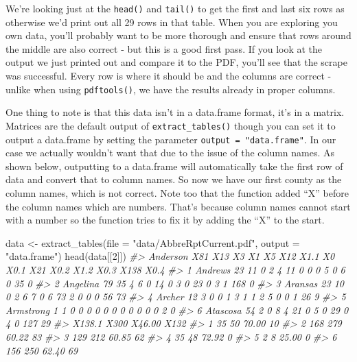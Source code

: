 \documentclass[
]{krantz}
\makeatletter
\newenvironment{Shaded}{\begin{snugshade}}{\end{snugshade}}
\newcommand{\AttributeTok}[1]{\textcolor[rgb]{0.61,0.61,0.61}{#1}}
\newcommand{\CommentTok}[1]{\textcolor[rgb]{0.37,0.37,0.37}{\textit{#1}}}
\newcommand{\DecValTok}[1]{\textcolor[rgb]{0.06,0.06,0.06}{#1}}
\newcommand{\FunctionTok}[1]{\textcolor[rgb]{0,0,0}{#1}}
\newcommand{\NormalTok}[1]{#1}
\newcommand{\OtherTok}[1]{\textcolor[rgb]{0.37,0.37,0.37}{#1}}
\newcommand{\StringTok}[1]{\textcolor[rgb]{0.5,0.5,0.5}{#1}}
\newenvironment{kframe}{%
\medskip{}
\setlength{\fboxsep}{.8em}
 \def\at@end@of@kframe{}%
 \ifinner\ifhmode%
  \def\at@end@of@kframe{\end{minipage}}%
  \begin{minipage}{\columnwidth}%
 \fi\fi%
 \def\FrameCommand##1{\hskip\@totalleftmargin \hskip-\fboxsep
 \colorbox{shadecolor}{##1}\hskip-\fboxsep
     \hskip-\linewidth \hskip-\@totalleftmargin \hskip\columnwidth}%
 \MakeFramed {\advance\hsize-\width
   \@totalleftmargin\z@ \linewidth\hsize
   \@setminipage}}%
 {\par\unskip\endMakeFramed%
 \at@end@of@kframe}
\renewenvironment{Shaded}{\begin{kframe}}{\end{kframe}}
\makeatother
\begin{document}
We're looking just at the \texttt{head()} and \texttt{tail()} to get the first and last six rows as otherwise we'd print out all 29 rows in that table. When you are exploring you own data, you'll probably want to be more thorough and ensure that rows around the middle are also correct - but this is a good first pass. If you look at the output we just printed out and compare it to the PDF, you'll see that the scrape was successful. Every row is where it should be and the columns are correct - unlike when using \texttt{pdftools()}, we have the results already in proper columns.

One thing to note is that this data isn't in a data.frame format, it's in a matrix. Matrices are the default output of \texttt{extract\_tables()} though you can set it to output a data.frame by setting the parameter \texttt{output\ =\ "data.frame"}. In our case we actually wouldn't want that due to the issue of the column names. As shown below, outputting to a data.frame will automatically take the first row of data and convert that to column names. So now we have our first county as the column names, which is not correct. Note too that the function added ``X'' before the column names which are numbers. That's because column names cannot start with a number so the function tries to fix it by adding the ``X'' to the start.

\begin{Shaded}
\begin{Highlighting}[]
\NormalTok{data }\OtherTok{\textless{}{-}} \FunctionTok{extract\_tables}\NormalTok{(}\AttributeTok{file =} \StringTok{"data/AbbreRptCurrent.pdf"}\NormalTok{, }\AttributeTok{output =} \StringTok{"data.frame"}\NormalTok{)}
\FunctionTok{head}\NormalTok{(data[[}\DecValTok{2}\NormalTok{]])}
\CommentTok{\#\textgreater{}    Anderson X81 X13 X3 X1 X5 X12 X1.1 X0 X0.1 X21 X0.2 X1.2 X0.3 X138 X0.4}
\CommentTok{\#\textgreater{} 1   Andrews  23  11  0  2  4  11    0  0    0   5    0    6    0   35    0}
\CommentTok{\#\textgreater{} 2  Angelina  79  35  4  6  0  14    0  3    0  23    0    3    1  168    0}
\CommentTok{\#\textgreater{} 3   Aransas  23  10  0  2  6   7    0  6   73   2    0    0    0   56   73}
\CommentTok{\#\textgreater{} 4    Archer  12   3  0  0  1   3    1  1    2   5    0    0    1   26    9}
\CommentTok{\#\textgreater{} 5 Armstrong   1   1  0  0  0   0    0  0    0   0    0    0    0    2    0}
\CommentTok{\#\textgreater{} 6  Atascosa  54   2  0  8  4  21    0  5    0  29    0    4    0  127   29}
\CommentTok{\#\textgreater{}   X138.1 X300 X46.00 X132}
\CommentTok{\#\textgreater{} 1     35   50  70.00   10}
\CommentTok{\#\textgreater{} 2    168  279  60.22   83}
\CommentTok{\#\textgreater{} 3    129  212  60.85   62}
\CommentTok{\#\textgreater{} 4     35   48  72.92    0}
\CommentTok{\#\textgreater{} 5      2    8  25.00    0}
\CommentTok{\#\textgreater{} 6    156  250  62.40   69}
\end{Highlighting}
\end{Shaded}
\end{document}

